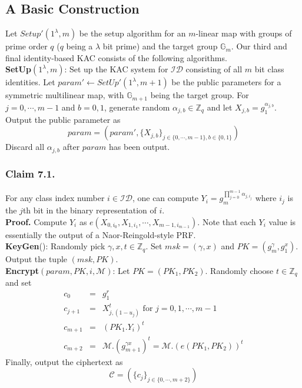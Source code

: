 \subsection{A Basic Construction}
\label{subsec:construction_third}

Let $Setup'(1^\lambda,m)$ be the setup algorithm for an $m$-linear map with groups of prime order $q$ ($q$ being a $\lambda$ bit prime) and the target group $\mathbb{G}_{m}$. Our third and final identity-based KAC consists of the following algorithms.\\

\noindent\textbf{SetUp}$(1^{\lambda},m)$: Set up the KAC system for $\mathcal{ID}$ consisting of all $m$ bit class identities. Let $param'\leftarrow SetUp'(1^{\lambda},m+1)$ be the public parameters for a symmetric multilinear map, with $\mathbb{G}_{m+1}$ being the target group. For $j=0,\cdots,m-1$ and $b=0,1$, generate random $\alpha_{j,b}\in\mathbb{Z}_q$ and let $X_{j,b}=g^{\alpha_{j,b}}_1$. Output the public parameter as
\begin{equation}
 param = (param',\{X_{j,b}\}_{j\in\{0,\cdots,m-1\},b\in\{0,1\}})\nonumber
\end{equation}
\noindent Discard all $\alpha_{j,b}$ after $param$ has been output. 

\subsubsection{Claim 7.1.} For any class index number $i\in\mathcal{ID}$, one can compute $Y_i=g^{\prod_{j=0}^{m-1}\alpha_{j,i_j}}_m$ where $i_j$ is the $j$th bit in the binary representation of $i$.\\

\noindent \textbf{Proof.} Compute $Y_i$ as $e(X_{0,i_0},X_{1,i_1},\cdots,X_{m-1,i_{m-1}})$. Note that each $Y_i$ value is essentially the output of a Naor-Reingold-style PRF.\\

\noindent \textbf{KeyGen}(): Randomly pick $\gamma,x,t \in \mathbb{Z}_q$. Set $msk=(\gamma,x)$ and $PK=(g^{\gamma}_{m},g^{x}_1)$. Output the tuple $(msk,PK)$.\\

\noindent \textbf{Encrypt}$(param,PK,i,\mathcal{M})$: Let $PK=(PK_1,PK_2)$. Randomly choose $t\in\mathbb{Z}_q$ and set
\begin{eqnarray}
 c_0&=&g^{r}_1 \nonumber\\
 c_{j+1}&=&X^{t}_{j,\left(1-u_{j}\right)} \text{ for } j=0,1,\cdots,m-1\nonumber\\
 c_{m+1}&=&{\left(PK_1.Y_i\right)}^{t}\nonumber\\
 c_{m+2}&=&\mathcal{M}.\left(g^{\gamma x}_{m+1}\right)^{t}=\mathcal{M}.\left(e(PK_1,PK_2)\right)^{t}\nonumber
\end{eqnarray}
\noindent Finally, output the ciphertext as 
\begin{equation}
 \mathcal{C}=(\{c_j\}_{j\in\{0,\cdots,m+2\}})\nonumber
\end{equation}

